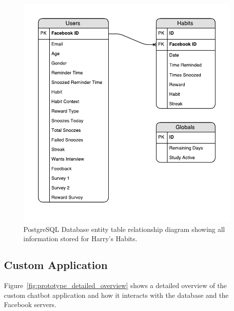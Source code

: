 \begin{figure}[H]
    \centering
    \includegraphics[width=5in]{../resources/diagrams/database-diagram.pdf}
    \caption{PostgreSQL Database entity table relationship diagram showing all information stored for Harry's Habits.}
    \label{fig:db_diagram}
\end{figure}


\subsection{Custom Application}
Figure~\ref{fig:prototype_detailed_overview} shows a detailed overview of the custom chatbot application and how it interacts with the database and the Facebook servers.

